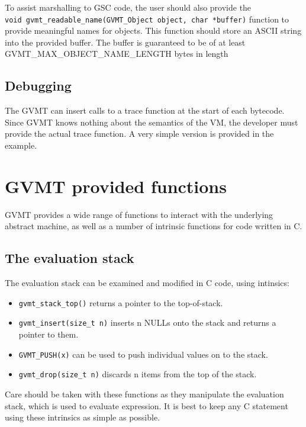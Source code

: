 To assist marshalling to GSC code, the user should also provide the \\
\verb|void gvmt_readable_name(GVMT_Object object, char *buffer)| function to provide meaningful names for objects.
This function should store an ASCII string into the provided buffer. The buffer is guaranteed to be of at least GVMT\_MAX\_OBJECT\_NAME\_LENGTH bytes in length 

\subsection{Debugging}
The GVMT can insert calls to a trace function at the start of each bytecode. Since GVMT knows nothing about the semantics of the VM, the developer must provide the actual trace function. A very simple version is provided in the example.

\section{GVMT provided functions}
GVMT provides a wide range of functions to interact with the underlying abstract machine, as well as a number of intrinsic functions for code written in C.

\subsection{The evaluation stack}
The evaluation stack can be examined and modified in C code, using intinsics:
\begin{itemize}
\item \verb|gvmt_stack_top()| returns a pointer to the top-of-stack.
\item \verb|gvmt_insert(size_t n)| inserts n NULLs onto the stack and returns a pointer to them.
\item \verb|GVMT_PUSH(x)| can be used to push individual values on to the stack.
\item \verb|gvmt_drop(size_t n)| discards n items from the top of the stack.
\end{itemize}
Care should be taken with these functions as they manipulate the evaluation stack, which is used to evaluate expression. It is best to keep any C statement using these intrinsics as simple as possible.

